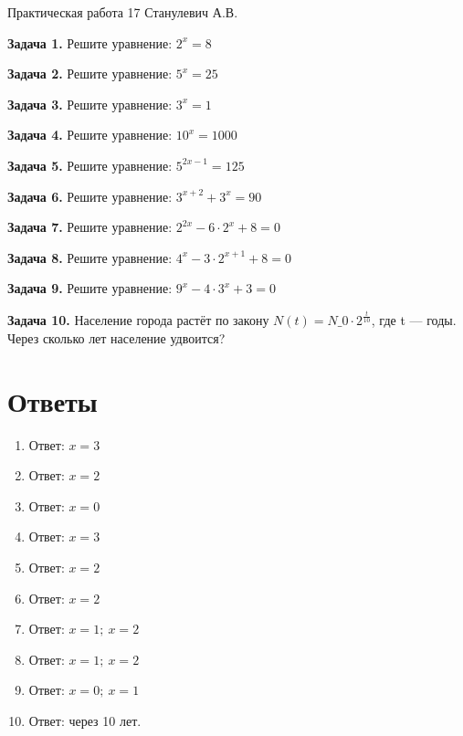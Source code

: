\documentclass{umk-matematika}
\begin{document}
\maketitlepage
    {Практическая работа 17}
    {}
    {Станулевич А.В.}

\textbf{Задача 1.} Решите уравнение: $2^x = 8$\par\vspace{10pt}
\textbf{Задача 2.} Решите уравнение: $5^x = 25$\par\vspace{10pt}
\textbf{Задача 3.} Решите уравнение: $3^x = 1$\par\vspace{10pt}
\textbf{Задача 4.} Решите уравнение: $10^x = 1000$\par\vspace{10pt}
\textbf{Задача 5.} Решите уравнение: $5^{2x-1} = 125$\par\vspace{10pt}
\textbf{Задача 6.} Решите уравнение: $3^{x+2} + 3^x = 90$\par\vspace{10pt}
\textbf{Задача 7.} Решите уравнение: $2^{2x} - 6 \cdot 2^x + 8 = 0$\par\vspace{10pt}
\textbf{Задача 8.} Решите уравнение: $4^x - 3 \cdot 2^{x+1} + 8 = 0$\par\vspace{10pt}
\textbf{Задача 9.} Решите уравнение: $9^x - 4 \cdot 3^x + 3 = 0$\par\vspace{10pt}
\textbf{Задача 10.} Население города растёт по закону $N(t) = N\_0 \cdot 2^{\frac{t}{10}}$, где t — годы. Через сколько лет население удвоится?\par\vspace{10pt}
\newpage
\section*{Ответы}

\begin{enumerate}
  \item Ответ: $x = 3$
  \item Ответ: $x = 2$
  \item Ответ: $x = 0$
  \item Ответ: $x = 3$
  \item Ответ: $x = 2$
  \item Ответ: $x = 2$
  \item Ответ: $x = 1;\ x = 2$
  \item Ответ: $x = 1;\ x = 2$
  \item Ответ: $x = 0;\ x = 1$
  \item Ответ: через 10 лет.
\end{enumerate}
\end{document}
